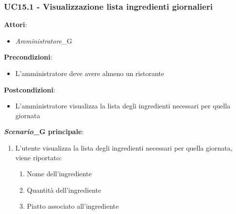 \subsubsection{UC15.1 - Visualizzazione lista ingredienti giornalieri}\label{usecase:15_1}
\textbf{Attori}:
\begin{itemize}
    \item \textit{Amministratore}_G
\end{itemize}
\textbf{Precondizioni}:
\begin{itemize}
    \item L'amministratore deve avere almeno un ristorante
\end{itemize}
\textbf{Postcondizioni}:
\begin{itemize}
    \item L'amministratore visualizza la lista degli ingredienti necessari per quella giornata
\end{itemize}
\textbf{\textit{Scenario}_G principale}:
\begin{enumerate}
    \item L'utente visualizza la lista degli ingredienti necessari per quella giornata, viene riportato:
    \begin{enumerate}
        \item Nome dell'ingrediente
        \item Quantità dell'ingrediente
        \item Piatto associato all'ingrediente
    \end{enumerate}
\end{enumerate}
